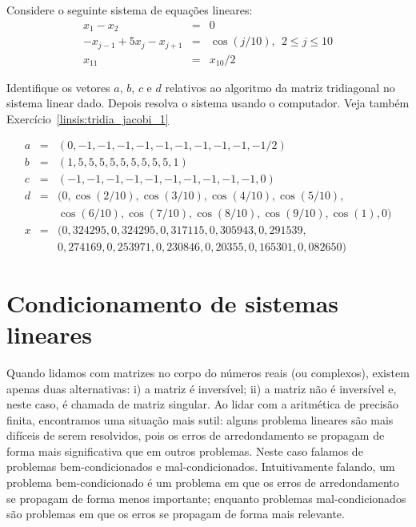 \begin{exer}\label{linsis:tridia_jacobi_2} Considere o seguinte sistema de equações lineares:
\begin{eqnarray}
x_1-x_2&=&0\nonumber\\
-x_{j-1}+5x_j-x_{j+1}&=&\cos(j/10),~~ 2\leq j \leq 10\nonumber\\
x_{11}&=&x_{10}/2
\end{eqnarray}

Identifique os vetores $a$, $b$, $c$ e $d$  relativos ao algoritmo da matriz tridiagonal no sistema linear dado.  Depois resolva o sistema usando o computador. Veja também Exercício~\ref{linsis:tridia_jacobi_1}
 \end{exer}
\begin{resp}
 \begin{eqnarray}
  a &=& (0, -1, -1, -1, -1, -1, -1, -1, -1, -1, -1/2)\\
  b &=& (1,  5,  5,  5,  5,  5,  5,  5,  5,  5,  1)\\
  c &=& (-1, -1, -1, -1, -1, -1, -1, -1, -1, -1, 0)\\
  d &=& (0, \cos(2/10), \cos(3/10), \cos(4/10), \cos(5/10),\\&& \cos(6/10), \cos(7/10), \cos(8/10), \cos(9/10), \cos(1) ,0)\\
  x &=& (0,324295, 0,324295, 0,317115, 0,305943, 0,291539,\\&& 0,274169, 0,253971, 0,230846, 0,20355, 0,165301, 0,082650)
 \end{eqnarray}
\end{resp}



\section{Condicionamento de sistemas lineares}

Quando lidamos com matrizes no corpo do números reais (ou complexos), existem apenas duas alternativas: i) a matriz é inversível; ii) a matriz não é inversível e, neste caso, é chamada de matriz singular. Ao lidar com a aritmética de precisão finita, encontramos uma situação mais sutil: alguns problema lineares são mais difíceis de serem resolvidos, pois os erros de arredondamento se propagam de forma mais significativa que em outros problemas. Neste caso falamos de problemas bem-condicionados e mal-condicionados. Intuitivamente falando, um problema bem-condicionado é um problema em que os erros de arredondamento se propagam de forma menos importante; enquanto problemas mal-condicionados são problemas em que os erros se propagam de forma mais relevante.

